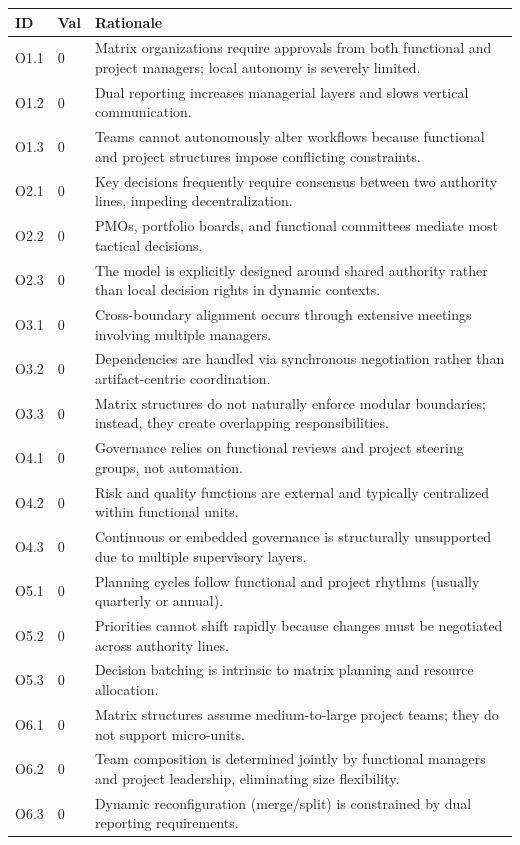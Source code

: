 \documentclass[11pt, a4paper, twocolumn]{article} %
\begin{document}
\begin{table}[h]
\centering
\begingroup\small
\setlength{\tabcolsep}{4pt}%
\begin{tabularx}{\linewidth}{llX}
\toprule
\textbf{ID} & \textbf{Val} & \textbf{Rationale} \\
\midrule
O1.1 & 0 &
Matrix organizations require approvals from both functional and project managers; local autonomy is severely limited. \\
O1.2 & 0 &
Dual reporting increases managerial layers and slows vertical communication. \\
O1.3 & 0 &
Teams cannot autonomously alter workflows because functional and project structures impose conflicting constraints. \\
\midrule
O2.1 & 0 &
Key decisions frequently require consensus between two authority lines, impeding decentralization. \\
O2.2 & 0 &
PMOs, portfolio boards, and functional committees mediate most tactical decisions. \\
O2.3 & 0 &
The model is explicitly designed around shared authority rather than local decision rights in dynamic contexts. \\
\midrule
O3.1 & 0 &
Cross-boundary alignment occurs through extensive meetings involving multiple managers. \\
O3.2 & 0 &
Dependencies are handled via synchronous negotiation rather than artifact-centric coordination. \\
O3.3 & 0 &
Matrix structures do not naturally enforce modular boundaries; instead, they create overlapping responsibilities. \\
\midrule
O4.1 & 0 &
Governance relies on functional reviews and project steering groups, not automation. \\
O4.2 & 0 &
Risk and quality functions are external and typically centralized within functional units. \\
O4.3 & 0 &
Continuous or embedded governance is structurally unsupported due to multiple supervisory layers. \\
\midrule
O5.1 & 0 &
Planning cycles follow functional and project rhythms (usually quarterly or annual). \\
O5.2 & 0 &
Priorities cannot shift rapidly because changes must be negotiated across authority lines. \\
O5.3 & 0 &
Decision batching is intrinsic to matrix planning and resource allocation. \\
\midrule
O6.1 & 0 &
Matrix structures assume medium-to-large project teams; they do not support micro-units. \\
O6.2 & 0 &
Team composition is determined jointly by functional managers and project leadership, eliminating size flexibility. \\
O6.3 & 0 &
Dynamic reconfiguration (merge/split) is constrained by dual reporting requirements. \\
\bottomrule
\end{tabularx}
\endgroup
\end{table}
\end{document}
